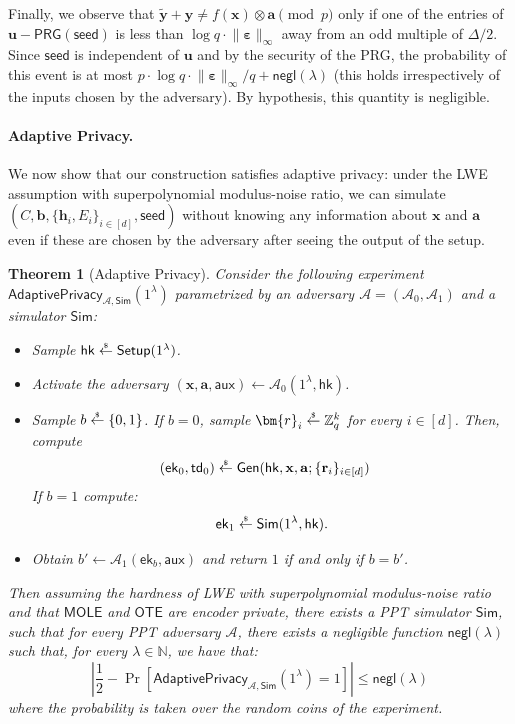 \documentclass{article}
\newtheorem{theorem}{Theorem}\newtheorem{lemma}[theorem]{Lemma}\newtheorem{proposition}[theorem]{Proposition}\newtheorem{corollary}[theorem]{Corollary}\newtheorem{definition}[theorem]{Definition}\newtheorem{claim}[theorem]{Claim}
\newcommand{\ek}{\mathsf{ek}}
\newcommand{\td}{\mathsf{td}}
\newcommand{\MOLE}{\mathsf{MOLE}}
\newcommand{\getsr}{\overset{\raisebox{-1pt}{$\scriptscriptstyle \$$}}{\gets}}
\newcommand{\sample}{\getsr}
\newcommand{\OTE}{\mathsf{OTE}}
\newcommand{\N}{\mathbb{N}}
\newcommand{\Z}{\mathbb{Z}}
\newcommand{\negl}{\mathsf{negl}}
\renewcommand{\sec}{\ensuremath{\lambda}}
\newcommand{\aux}{\mathsf{aux}}
\newcommand{\Sim}{\mathsf{Sim}}
\newcommand{\Adv}{\mathcal{A}}
\newcommand{\algofont}[1]{\ensuremath{\mathsf{#1}}}
\newcommand{\Setup}{{\algofont{Setup}}}
\newcommand{\Gen}{{\algofont{Gen}}}
\newcommand{\hk}{\ensuremath{\mathsf{hk}}}
\newcommand{\thmlab}[1]{\label{thm:#1}}
\newcommand\bbbone{1}
\begin{document}
    Finally, we observe that $\tilde{\mathbf{y}}+\mathbf{y}\ne f(\mathbf{x})\otimes \mathbf{a}\pmod p$ only if one of the entries of $\mathbf{u}-\mathsf{PRG}(\mathsf{seed})$ is less than $\log q\cdot \lVert \bm{\varepsilon}\rVert_\infty$ away from an odd multiple of $\Delta/2$. Since $\mathsf{seed}$ is independent of $\mathbf{u}$ and by the security of the PRG, the probability of this event is at most $p\cdot \log q\cdot \lVert\bm{\varepsilon}\rVert_\infty/q+\negl(\sec)$ {(this holds irrespectively of the inputs chosen by the adversary).} By hypothesis, this quantity is negligible.

\paragraph{Adaptive Privacy.} We now show that our construction satisfies adaptive privacy: under the LWE assumption with superpolynomial modulus-noise ratio, we can simulate $(C, \mathbf{b}, \{\mathbf{h}_i, E_i\}_{i\in[d]}, \mathsf{seed})$ without knowing any information about $\mathbf{x}$ and $\mathbf{a}$ even if these are chosen by the adversary after seeing the output of the setup. 
\begin{theorem}[Adaptive Privacy]
\thmlab{RMSLFE}
    Consider the following experiment $\mathsf{AdaptivePrivacy}_{\Adv, \Sim}(\bbbone^\sec)$ parametrized by an adversary $\Adv = (\Adv_0, \Adv_1)$ and a simulator $\Sim$:
\begin{itemize}
\item Sample $\hk\sample\Setup(\bbbone^\sec)$.
\item Activate the adversary $(\mathbf{x}, \mathbf{a}, \aux)\gets\Adv_0(\bbbone^\sec, \hk)$.
\item Sample $b\sample\{0, 1\}$. If $b = 0$, sample $\bm{r}_{i}\sample\Z_q^k$ for every $i\in[d]$. Then, compute 
\begin{align*}
    (\ek_0, \td_0)&\sample\Gen(\hk, \mathbf{x}, \mathbf{a}; \{\mathbf{r}_i\}_{i\in[d]})
\end{align*}
If $b=1$ compute:
\[
\ek_1\sample\Sim(\bbbone^\sec, \hk).
\]
\item Obtain $b' \gets \Adv_1(\ek_b, \aux)$ and return $1$ if and only if $b=b'$.
\end{itemize}
Then assuming the hardness of LWE with superpolynomial modulus-noise ratio and that $\MOLE$ and $\OTE$ are encoder private, there exists a PPT simulator $\Sim$, such that for every PPT adversary $\mathcal{A}$, there exists a negligible function $\negl(\sec)$ such that, for every $\sec\in\N$, we have that:
\[
\left|\frac{1}{2} - \Pr\left[\mathsf{AdaptivePrivacy}_{\mathcal{A}, \Sim}(\bbbone^\sec) = 1\right] \right|\le\negl(\sec)
\]
where the probability is taken over the random coins of the experiment.

\end{theorem}
\end{document}
